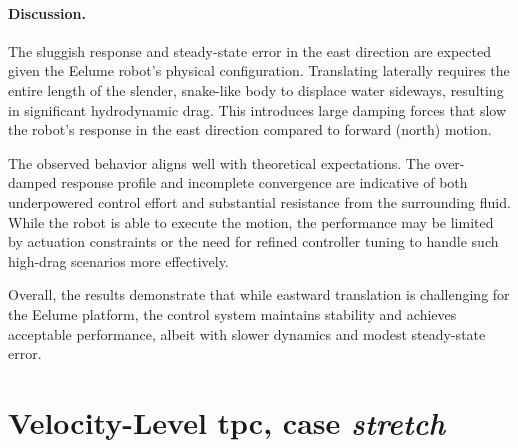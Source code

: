 \paragraph{Discussion.}

The sluggish response and steady-state error in the east direction are 
expected given the Eelume robot's physical configuration. Translating 
laterally requires the entire length of the slender, snake-like body to 
displace water sideways, resulting in significant hydrodynamic drag. This 
introduces large damping forces that slow the robot's response in the east 
direction compared to forward (north) motion.

The observed behavior aligns well with theoretical expectations. The over-
damped response profile and incomplete convergence are indicative of both 
underpowered control effort and substantial resistance from the surrounding 
fluid. While the robot is able to execute the motion, the performance may be 
limited by actuation constraints or the need for refined controller tuning to 
handle such high-drag scenarios more effectively.

Overall, the results demonstrate that while eastward translation is 
challenging for the Eelume platform, the control system maintains stability 
and achieves acceptable performance, albeit with slower dynamics and modest 
steady-state error.

\FloatBarrier

\newpage
\section{Velocity-Level \gls{tpc}, case \textit{stretch}}

